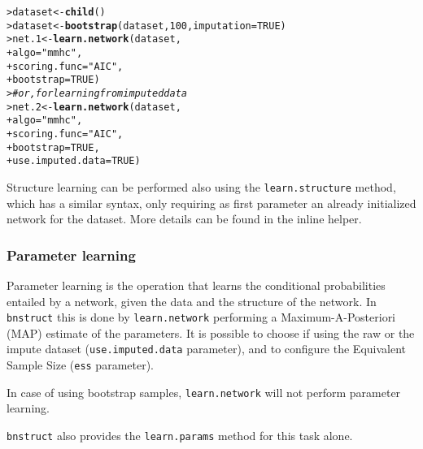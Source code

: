 \documentclass{article}\usepackage[]{graphicx}\usepackage[]{color}
\makeatletter
\newcommand{\hlnum}[1]{\textcolor[rgb]{0.686,0.059,0.569}{#1}}%
\newcommand{\hlstr}[1]{\textcolor[rgb]{0.192,0.494,0.8}{#1}}%
\newcommand{\hlcom}[1]{\textcolor[rgb]{0.678,0.584,0.686}{\textit{#1}}}%
\newcommand{\hlstd}[1]{\textcolor[rgb]{0.345,0.345,0.345}{#1}}%
\newcommand{\hlkwb}[1]{\textcolor[rgb]{0.69,0.353,0.396}{#1}}%
\newcommand{\hlkwc}[1]{\textcolor[rgb]{0.333,0.667,0.333}{#1}}%
\newcommand{\hlkwd}[1]{\textcolor[rgb]{0.737,0.353,0.396}{\textbf{#1}}}%
\newenvironment{kframe}{%
 \def\at@end@of@kframe{}%
 \ifinner\ifhmode%
  \def\at@end@of@kframe{\end{minipage}}%
  \begin{minipage}{\columnwidth}%
 \fi\fi%
 \def\FrameCommand##1{\hskip\@totalleftmargin \hskip-\fboxsep
 \colorbox{shadecolor}{##1}\hskip-\fboxsep
     \hskip-\linewidth \hskip-\@totalleftmargin \hskip\columnwidth}%
 \MakeFramed {\advance\hsize-\width
   \@totalleftmargin\z@ \linewidth\hsize
   \@setminipage}}%
 {\par\unskip\endMakeFramed%
 \at@end@of@kframe}
\newenvironment{knitrout}{}{} %
\newcommand{\Rpackage}[1]{{\texttt{#1}}}
\newcommand{\Rmethod}[1]{{\texttt{#1}}}
\newcommand{\Rfunarg}[1]{{\texttt{#1}}}
\makeatother
\begin{document}
\begin{knitrout}
\color{fgcolor}\begin{kframe}
\begin{alltt}
\hlstd{> }\hlstd{dataset} \hlkwb{<-} \hlkwd{child}\hlstd{()}
\hlstd{> }\hlstd{dataset} \hlkwb{<-} \hlkwd{bootstrap}\hlstd{(dataset,} \hlnum{100}\hlstd{,} \hlkwc{imputation} \hlstd{=} \hlnum{TRUE}\hlstd{)}
\hlstd{> }\hlstd{net.1}   \hlkwb{<-} \hlkwd{learn.network}\hlstd{(dataset,}
\hlstd{+ }                         \hlkwc{algo} \hlstd{=} \hlstr{"mmhc"}\hlstd{,}
\hlstd{+ }                         \hlkwc{scoring.func} \hlstd{=} \hlstr{"AIC"}\hlstd{,}
\hlstd{+ }                         \hlkwc{bootstrap} \hlstd{=} \hlnum{TRUE}\hlstd{)}
\hlstd{> }\hlcom{# or, for learning from imputed data}
\hlstd{> }\hlstd{net.2}   \hlkwb{<-} \hlkwd{learn.network}\hlstd{(dataset,}
\hlstd{+ }                         \hlkwc{algo} \hlstd{=} \hlstr{"mmhc"}\hlstd{,}
\hlstd{+ }                         \hlkwc{scoring.func} \hlstd{=} \hlstr{"AIC"}\hlstd{,}
\hlstd{+ }                         \hlkwc{bootstrap} \hlstd{=} \hlnum{TRUE}\hlstd{,}
\hlstd{+ }                         \hlkwc{use.imputed.data} \hlstd{=} \hlnum{TRUE}\hlstd{)}
\end{alltt}
\end{kframe}
\end{knitrout}

Structure learning can be performed also using the \Rmethod{learn.structure} method, which has a similar syntax, only requiring as
first parameter an already initialized network for the dataset. More details can be found in the inline helper.

\subsubsection{Parameter learning}
Parameter learning is the operation that learns the conditional probabilities entailed by a network,
given the data and the structure of the network. In \Rpackage{bnstruct} this is done by \Rmethod{learn.network}
performing a Maximum-A-Posteriori (MAP) estimate of the parameters. It is possible to choose if using the raw
or the impute dataset (\Rfunarg{use.imputed.data} parameter), and to configure the
Equivalent Sample Size (\Rfunarg{ess} parameter).

In case of using bootstrap samples, \Rmethod{learn.network} will not perform parameter learning.

\Rpackage{bnstruct} also provides the \Rmethod{learn.params} method for this task alone.
\end{document}
